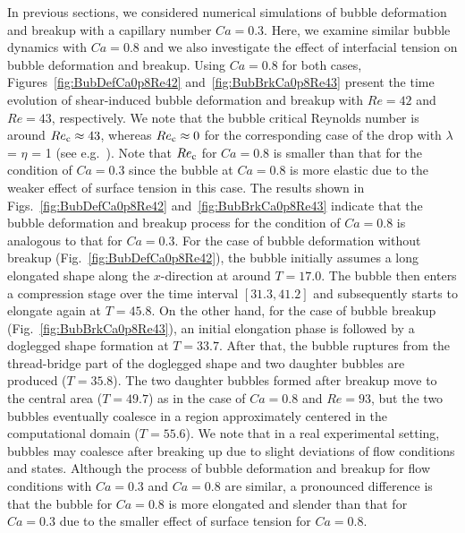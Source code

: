 \documentclass{elsarticle}
\begin{document}
%
%
In previous sections, we considered numerical simulations of bubble deformation
and breakup with a capillary number $Ca = 0.3$.  Here, we examine similar
bubble dynamics with $Ca = 0.8$ and we also investigate the effect of
interfacial tension on bubble deformation and breakup.  Using $Ca=0.8$ for both
cases, Figures~\ref{fig:BubDefCa0p8Re42} and~\ref{fig:BubBrkCa0p8Re43} present
the time evolution of shear-induced bubble deformation and breakup with $Re=42$
and $Re=43$, respectively.  We note that the bubble critical Reynolds number is
around $Re_{\rm c} \approx 43$, whereas $Re_{\rm c} \approx 0$ for the corresponding
case of the drop with 
$\lambda$ = $\eta$ = 1 (see e.g.~\citet{LiRenRen00}).
Note that $Re_{\rm c}$ for $Ca = 0.8$ is smaller than that for the condition of $Ca
= 0.3$ since the bubble at $Ca = 0.8$ is more elastic due to the weaker effect
of surface tension in this case.  The results shown in
Figs.~\ref{fig:BubDefCa0p8Re42} and~\ref{fig:BubBrkCa0p8Re43} indicate that the
bubble deformation and breakup process for the condition of $Ca = 0.8$ is
analogous to that for $Ca = 0.3$.  For the case of bubble deformation without
breakup (Fig.~\ref{fig:BubDefCa0p8Re42}), the bubble initially assumes a long
elongated shape along the $x$-direction at around $T=17.0$. The bubble then
enters a compression stage over the time interval $[31.3,41.2]$ and
subsequently starts to elongate again at $T = 45.8$.  On the other hand, for
the case of bubble breakup (Fig.~\ref{fig:BubBrkCa0p8Re43}), an initial
elongation phase is followed by a doglegged shape formation at $T=33.7$.  After
that, the bubble ruptures from the thread-bridge part of the doglegged shape
and two daughter bubbles are produced ($T = 35.8$).  The two daughter bubbles
formed after breakup move to the central area ($T = 49.7$) as in the case of
$Ca = 0.8$ and $Re = 93$, but the two bubbles eventually coalesce in a region
approximately centered in the computational domain ($T = 55.6$).  We note that
in a real experimental setting, bubbles may coalesce after breaking up due to
slight deviations of flow conditions and states.  Although the process of
bubble deformation and breakup for flow conditions with $Ca = 0.3$ and $Ca =
0.8$ are similar, a pronounced difference is that the bubble for $Ca = 0.8$ is
more elongated and slender than that for $Ca = 0.3$ due to the smaller effect
of surface tension for $Ca = 0.8$.
\end{document}
